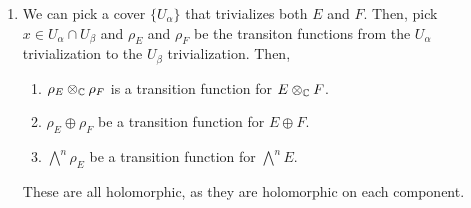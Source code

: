 \documentclass[12pt]{article}
\begin{document}
\begin{solu}
\begin{enumerate}
        \item We can pick a cover $\{U_\alpha\}$ that trivializes both $E$ and $F$. Then, pick $x \in U_\alpha \cap U_\beta$ and $\rho_E$ and $\rho_F$ be the transiton functions from the $U_\alpha$ trivialization to the $U_\beta$ trivialization. Then, 
        \begin{enumerate}
            \item $\rho_E \otimes_\mathbb C \rho_F$ is a transition function for $E \otimes_\mathbb C F$. 
            \item $\rho_E \oplus \rho_F$ be a transition function for $E \oplus F$.
            \item $\bigwedge^n \rho_E$ be a transition function for $\bigwedge^n E$.
        \end{enumerate}
        These are all holomorphic, as they are holomorphic on each component. 
        
    \end{enumerate}
\end{solu}


\end{document}
